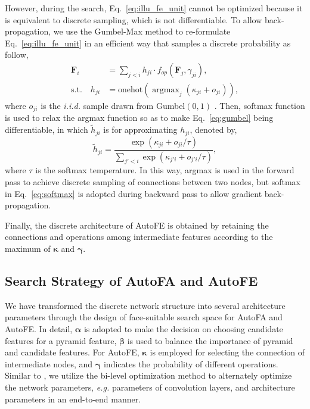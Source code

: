 \documentclass[sigconf]{acmart}
\begin{document}
However, during the search, Eq.~\ref{eq:illu_fe_unit} cannot be optimized because it is equivalent to discrete sampling, which is not differentiable. To allow back-propagation, we use the Gumbel-Max method \cite{dong2019gdas} to re-formulate Eq.~\ref{eq:illu_fe_unit} in an efficient way that samples a discrete probability as follow,
\begin{equation}\label{eq:gumbel}
    \begin{split}
    \mathbf{F}_i &= \sum\nolimits_{j<i} h_{ji}\cdot f_{op}(\mathbf{F}_j, \gamma_{ji}), \\
    \text{s.t.} \quad h_{ji} &= \text{onehot}(\mathop{\arg\max}_j(\kappa_{ji} + o_{ji})),
    \end{split}
\end{equation}
where $o_{ji}$ is the \textit{i.i.d.} sample drawn from Gumbel$(0,1)$ \cite{dong2019gdas}. Then, softmax function is used to relax the argmax function so as to make Eq.~\ref{eq:gumbel} being differentiable, in which $\tilde{h}_{ji}$ is for approximating $h_{ji}$, denoted by,
\begin{equation}\label{eq:softmax}
    \tilde{h}_{ji} = \frac{\exp{(\kappa_{ji} + o_{ji}/\tau)}}{\sum\nolimits_{j'<i}\exp{(\kappa_{j'i} + o_{j'i}/\tau)}},
\end{equation}
where $\tau$ is the softmax temperature. In this way, argmax is used in the forward pass to achieve discrete sampling of connections between two nodes, but softmax in Eq.~\ref{eq:softmax} is adopted during backward pass to allow gradient back-propagation.

Finally, the discrete architecture of AutoFE is obtained by retaining the connections and operations among intermediate features according to the maximum of $\boldsymbol{\kappa}$ and $\boldsymbol{\gamma}$.

\subsection{Search Strategy of AutoFA and AutoFE}
We have transformed the discrete network structure into several architecture parameters through the design of face-suitable search space for AutoFA and AutoFE. In detail, $\boldsymbol{\alpha}$ is adopted to make the decision on choosing candidate features for a pyramid feature, $\boldsymbol{\beta}$ is used to balance the importance of pyramid and candidate features. For AutoFE, $\boldsymbol{\kappa}$ is employed for selecting the connection of intermediate nodes, and $\boldsymbol{\gamma}$ indicates the probability of different operations. Similar to \cite{liu2018darts,chen2019pdarts,xu2019pcdarts}, we utilize the bi-level optimization method to alternately optimize the network parameters, \textit{e.g.} parameters of convolution layers, and architecture parameters in an end-to-end manner.
\end{document}
